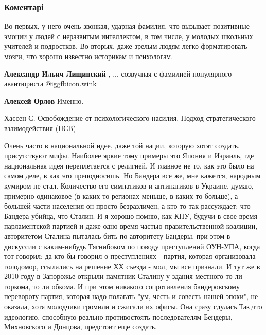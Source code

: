  
 
 
 
 
\subsubsection{Коментарі}

\begin{itemize} %

Во-первых, у него очень звонкая, ударная фамилия, что вызывает позитивные
эмоции у людей с неразвитым интеллектом, в том числе, у молодых школьных
учителей и подростков. Во-вторых, даже зрелым людям легко форматировать мозги,
что хорошо известно историкам и психологам.

\begin{itemize} %
\textbf{Александр Ильич Лищинский} , ... созвучная с фамилией популярного авантюриста  @igg{fbicon.wink} 

\textbf{Алексей Орлов} Именно.
\end{itemize} %


Хассен С. Освобождение от психологического насилия. Подход стратегического
взаимодействия (ПСВ)


Очень часто в национальной идее, даже той нации, которую хотят создать,
присутствуют мифы. Наиболее яркие тому примеры это Япония и Израиль, где
национальная идея переплетается с религией. И главное не то, как это было на
самом деле, в как это преподносишь. Но Бандера все же, мне кажется, народным
кумиром не стал. Количество его симпатиков и антипатиков в Украине, думаю,
примерно одинаковое (в каких-то регионах меньше, в каких-то больше), а большей
части населения он просто безразличен, а кто-то так рассуждает: что Бандера
убийца, что Сталин. И я хорошо помню, как КПУ, будучи в свое время
парламентской партией и даже одно время частью правительственной коалиции,
авторитетом Сталина пыталась бить по авторитету Бандеры, при этом в дискуссии с
каким-нибудь Тягнибоком по поводу преступлений ОУН-УПА, когда тот говорил: да
кто бы говорил о преступлениях - партия, которая организовала голодомор,
ссылались на решение ХХ съезда - мол, мы все признали. И тут же в 2010 году в
Запорожье открыли памятник Сталину у здания местного то ли горкома, то ли
обкома. И при этом никакого сопротивления бандеровскому перевороту партия,
которая надо полагать "ум, честь и совесть нашей эпохи", не оказала, хотя
молодчики громили и сжигали их офисы. Она сразу сдулась.Так,что идеологию,
способную реально противостоять последователям Бендеры, Михновского и Донцова,
предстоит еще создать.


\end{itemize}
